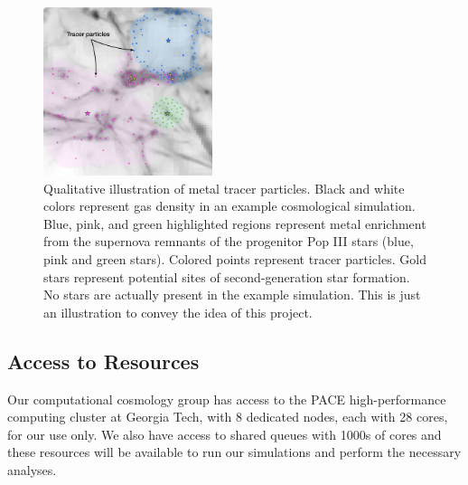 \documentclass[a4paper, 12pt]{article}
\begin{document}
\begin{figure}
  \includegraphics[width=0.44\textwidth]{figures/tracer_final}
  \caption{Qualitative illustration of metal tracer particles. Black and white colors represent gas density in an example cosmological simulation. Blue, pink, and green highlighted regions represent metal enrichment from the supernova remnants of the progenitor Pop III stars (blue, pink and green stars). Colored points represent tracer particles. Gold stars represent potential sites of second-generation star formation. No stars are actually present in the example simulation. This is just an illustration to convey the idea of this project.}
  \label{fig:tracer}    
\end{figure}


\subsection{Access to Resources}

Our computational cosmology group has access to the PACE high-performance computing cluster at Georgia Tech, with 8 dedicated nodes, each with 28 cores, for our use only. We also have access to shared queues with 1000s of cores and these resources will be available to run our simulations and perform the necessary analyses. 
\end{document}
